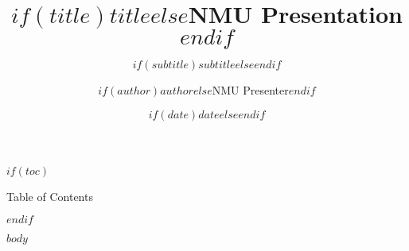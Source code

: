\documentclass[$if(fontsize)$$fontsize$,$endif$$if(handout)$handout,$endif$$if(beamer)$ignorenonframetext,$endif$$for(classoption)$$classoption$$sep$,$endfor$]{beamer}
\title{$if(title)$$title$$else$NMU Presentation$endif$}
\subtitle{$if(subtitle)$$subtitle$$else$$endif$}
\author{$if(author)$$author$$else$NMU Presenter$endif$}
\institute{$if(institute)$$institute$$else$Nelson Mandela University$endif$}
\date{$if(date)$$date$$else$$endif$}
\begin{document}
\begin{frame}[plain]
  \titlepage
\end{frame}

$if(toc)$
\begin{frame}[allowframebreaks]{Table of Contents}
\tableofcontents
\end{frame}
$endif$

$body$
\end{document}
